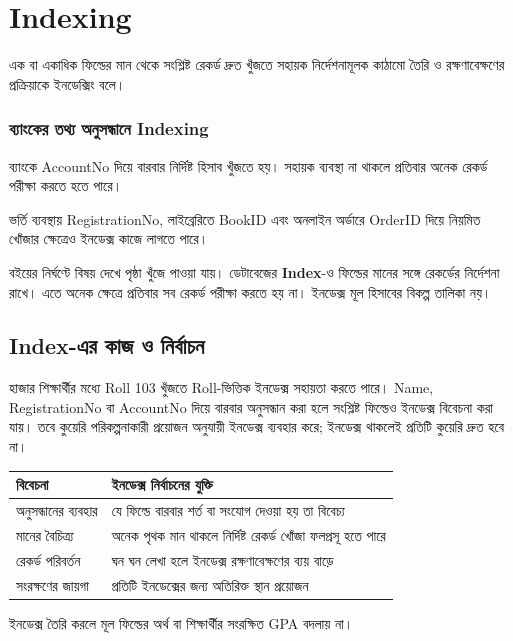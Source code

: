\section{Indexing}

\begin{definitionbox}{}
এক বা একাধিক ফিল্ডের মান থেকে সংশ্লিষ্ট রেকর্ড দ্রুত খুঁজতে সহায়ক নির্দেশনামূলক কাঠামো তৈরি ও রক্ষণাবেক্ষণের প্রক্রিয়াকে ইনডেক্সিং বলে।
\end{definitionbox}


\subsubsection{ব্যাংকের তথ্য অনুসন্ধানে Indexing}
ব্যাংকে AccountNo দিয়ে বারবার নির্দিষ্ট হিসাব খুঁজতে হয়। সহায়ক ব্যবস্থা না থাকলে প্রতিবার অনেক রেকর্ড পরীক্ষা করতে হতে পারে। 

ভর্তি ব্যবস্থায় RegistrationNo, লাইব্রেরিতে BookID এবং অনলাইন অর্ডারে OrderID দিয়ে নিয়মিত খোঁজার ক্ষেত্রেও ইনডেক্স কাজে লাগতে পারে।


বইয়ের নির্ঘণ্টে বিষয় দেখে পৃষ্ঠা খুঁজে পাওয়া যায়। ডেটাবেজের \textbf{Index}-ও ফিল্ডের মানের সঙ্গে রেকর্ডের নির্দেশনা রাখে। এতে অনেক ক্ষেত্রে প্রতিবার সব রেকর্ড পরীক্ষা করতে হয় না। ইনডেক্স মূল হিসাবের বিকল্প তালিকা নয়। 

\subsection{Index-এর কাজ ও নির্বাচন}
হাজার শিক্ষার্থীর মধ্যে Roll 103 খুঁজতে Roll-ভিত্তিক ইনডেক্স সহায়তা করতে পারে। Name, RegistrationNo বা AccountNo দিয়ে বারবার অনুসন্ধান করা হলে সংশ্লিষ্ট ফিল্ডেও ইনডেক্স বিবেচনা করা যায়। তবে কুয়েরি পরিকল্পনাকারী প্রয়োজন অনুযায়ী ইনডেক্স ব্যবহার করে; ইনডেক্স থাকলেই প্রতিটি কুয়েরি দ্রুত হবে না।
\begin{flushleft}\small
\begin{tabularx}{\linewidth}{|p{30mm}|X|}\hline
বিবেচনা & ইনডেক্স নির্বাচনের যুক্তি\\\hline
অনুসন্ধানের ব্যবহার & যে ফিল্ডে বারবার শর্ত বা সংযোগ দেওয়া হয় তা বিবেচ্য\\\hline
মানের বৈচিত্র্য & অনেক পৃথক মান থাকলে নির্দিষ্ট রেকর্ড খোঁজা ফলপ্রসূ হতে পারে\\\hline
রেকর্ড পরিবর্তন & ঘন ঘন লেখা হলে ইনডেক্স রক্ষণাবেক্ষণের ব্যয় বাড়ে\\\hline
সংরক্ষণের জায়গা & প্রতিটি ইনডেক্সের জন্য অতিরিক্ত স্থান প্রয়োজন\\\hline
\end{tabularx}
\end{flushleft}
ইনডেক্স তৈরি করলে মূল ফিল্ডের অর্থ বা শিক্ষার্থীর সংরক্ষিত GPA বদলায় না। 


